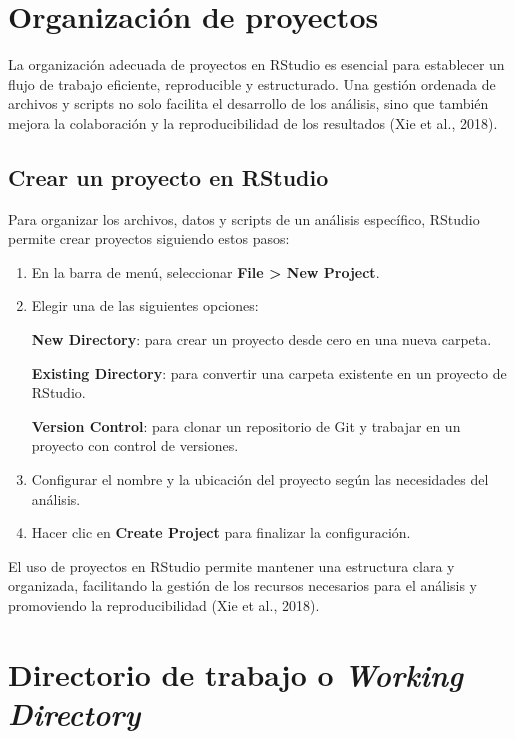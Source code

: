 \documentclass[
  spanish,
  letterpaper,
]{book}
\begin{document}
\section{Organización de proyectos}\label{organizaciuxf3n-de-proyectos}

La organización adecuada de proyectos en RStudio es esencial para
establecer un flujo de trabajo eficiente, reproducible y estructurado.
Una gestión ordenada de archivos y scripts no solo facilita el
desarrollo de los análisis, sino que también mejora la colaboración y la
reproducibilidad de los resultados (Xie et al., 2018).

\subsection{Crear un proyecto en
RStudio}\label{crear-un-proyecto-en-rstudio}

Para organizar los archivos, datos y scripts de un análisis específico,
RStudio permite crear proyectos siguiendo estos pasos:

\begin{enumerate}
\def\labelenumi{\arabic{enumi}.}
\item
  En la barra de menú, seleccionar \textbf{File \textgreater{} New
  Project}.
\item
  Elegir una de las siguientes opciones:

  \textbf{New Directory}: para crear un proyecto desde cero en una nueva
  carpeta.

  \textbf{Existing Directory}: para convertir una carpeta existente en
  un proyecto de RStudio.

  \textbf{Version Control}: para clonar un repositorio de Git y trabajar
  en un proyecto con control de versiones.
\item
  Configurar el nombre y la ubicación del proyecto según las necesidades
  del análisis.
\item
  Hacer clic en \textbf{Create Project} para finalizar la configuración.
\end{enumerate}

El uso de proyectos en RStudio permite mantener una estructura clara y
organizada, facilitando la gestión de los recursos necesarios para el
análisis y promoviendo la reproducibilidad (Xie et al., 2018).

\section{\texorpdfstring{Directorio de trabajo o \emph{Working
Directory}}{Directorio de trabajo o Working Directory}}\label{directorio-de-trabajo-o-working-directory}
\end{document}
